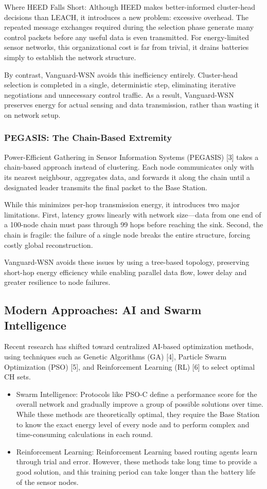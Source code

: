 \documentclass[conference]{IEEEtran}
\begin{document}
Where HEED Falls Short:
Although HEED makes better-informed cluster-head decisions than LEACH, it introduces a new problem: excessive overhead. The repeated message exchanges required during the selection phase generate many control packets before any useful data is even transmitted. For energy-limited sensor networks, this organizational cost is far from trivial, it drains batteries simply to establish the network structure.

By contrast, Vanguard-WSN avoids this inefficiency entirely. Cluster-head selection is completed in a single, deterministic step, eliminating iterative negotiations and unnecessary control traffic. As a result, Vanguard-WSN preserves energy for actual sensing and data transmission, rather than wasting it on network setup.

\subsubsection{PEGASIS: The Chain-Based Extremity}
Power-Efficient Gathering in Sensor Information Systems (PEGASIS) [3] takes a chain-based approach instead of clustering. Each node communicates only with its nearest neighbour, aggregates data, and forwards it along the chain until a designated leader transmits the final packet to the Base Station.

While this minimizes per-hop transmission energy, it introduces two major limitations. First, latency grows linearly with network size—data from one end of a 100-node chain must pass through 99 hops before reaching the sink. Second, the chain is fragile: the failure of a single node breaks the entire structure, forcing costly global reconstruction.

Vanguard-WSN avoids these issues by using a tree-based topology, preserving short-hop energy efficiency while enabling parallel data flow, lower delay  and greater resilience to node failures.

\subsection{Modern Approaches: AI and Swarm Intelligence}
Recent research has shifted toward centralized AI-based optimization methods, using techniques such as Genetic Algorithms (GA) [4], Particle Swarm Optimization (PSO) [5], and Reinforcement Learning (RL) [6] to select optimal CH sets.

\begin{itemize}
    \item Swarm Intelligence: Protocols like PSO-C define a performance score for the overall network and gradually improve a group of possible solutions over time. While these methods are theoretically optimal, they require the Base Station to know the exact energy level of every node and to perform complex and time-consuming calculations in each round.
    \item Reinforcement Learning: Reinforcement Learning based routing agents learn through trial and error. However, these methods take long time to provide a good solution, and this training period can take longer than the battery life of the sensor nodes.
\end{itemize}
\end{document}
